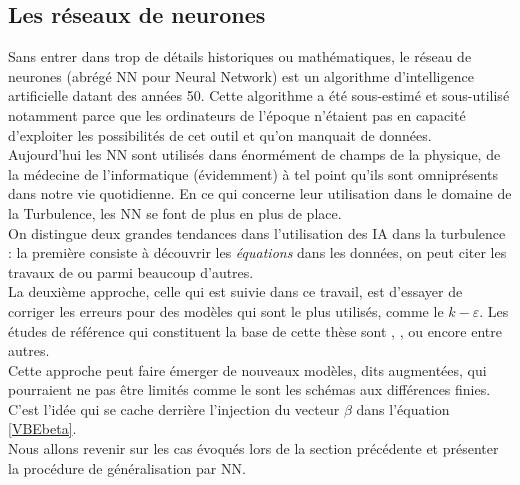 \documentclass[a4paper,12pt]{article}
\newcommand{\keps}{$k-\varepsilon$}
\newcommand\bk{\color{black}}
\newcommand\brick{\color{brick}}
\numberwithin{equation}{section} %
\begin{document}
\brick \subsection{Les réseaux de neurones} \bk 
\noindent Sans entrer dans trop de détails historiques ou mathématiques, le réseau de neurones (abrégé NN pour Neural Network) est un algorithme d'intelligence artificielle datant des années 50. Cette algorithme a été sous-estimé et sous-utilisé notamment parce que les ordinateurs de l'époque n'étaient pas en capacité d'exploiter les possibilités de cet outil et qu'on manquait de données.\\
Aujourd'hui les NN sont utilisés dans énormément de champs de la physique, de la médecine de l'informatique (évidemment) à tel point qu'ils sont omniprésents dans notre vie quotidienne. En ce qui concerne leur utilisation dans le domaine de la Turbulence, les NN se font de plus en plus de place. \\
On distingue deux grandes tendances dans l'utilisation des IA dans la turbulence : la première consiste à découvrir les \textit{équations} dans les données, on peut citer les travaux de \citep{kutz2017deep} ou \citep{raissi2018hidden} parmi beaucoup d'autres. \\
La deuxième approche, celle qui est suivie dans ce travail, est d'essayer de corriger les erreurs pour des modèles qui sont le plus utilisés, comme le \keps $ $. Les études de référence qui constituent la base de cette thèse sont \citep{parish2016paradigm}, \citep{singh2017machine}, \citep{wu2018data} ou encore \citep{wang2017physics} entre autres. \\

\noindent Cette approche peut faire émerger de nouveaux modèles, dits augmentées, qui pourraient ne pas être limités comme le sont les schémas aux différences finies. C'est l'idée qui se cache derrière l'injection du vecteur $\beta$ dans l'équation \eqref{VBEbeta}.\\
\noindent Nous allons revenir sur les cas évoqués lors de la section précédente et présenter la procédure de généralisation par NN.
\end{document}
